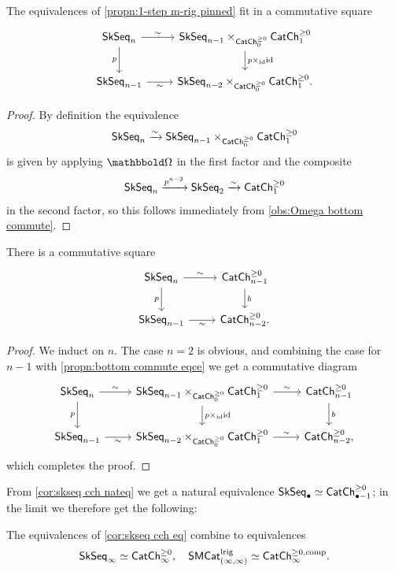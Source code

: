 \documentclass[a4paper,11pt]{article}
\begin{document}
\begin{propn}\label{propn:bottom commute eqce}
  The equivalences of \cref{propn:1-step m-rig pinned} fit in a
  commutative square
  \[
    \begin{tikzcd}
     \SkSeq_{n} \ar[r, "\sim"] \ar[d, "p"'] &
     \SkSeq_{n-1}\times_{\CChp_{0}} \CChp_{1}  \ar[d, "p \times_{\id} \id"] \\
     \SkSeq_{n-1} \ar[r, "\sim"'] & \SkSeq_{n-2} \times_{\CChp_{0}}
     \CChp_{1}.
    \end{tikzcd}
  \]
\end{propn}
\begin{proof}
  By definition the equivalence
  \[\SkSeq_{n} \isoto \SkSeq_{n-1}\times_{\CChp_{0}} \CChp_{1}\]
  is given by applying $\mOm$ in the first factor and the composite
  \[ \SkSeq_{n} \xto{p^{n-2}} \SkSeq_{2} \isoto \CChp_{1}\] in the
  second factor, so this follows immediately from \cref{obs:Omega
    bottom commute}.
\end{proof}

\begin{cor}\label{cor:skseq cch nateq}
  There is a commutative square
  \[
    \begin{tikzcd}
     \SkSeq_{n} \ar[r, "\sim"] \ar[d, "p"'] & \CChp_{n-1}  \ar[d, "b"] \\
     \SkSeq_{n-1} \ar[r, "\sim"'] & \CChp_{n-2}.
    \end{tikzcd}
  \]
\end{cor}
\begin{proof}
  We induct on $n$. The case $n = 2$ is obvious, and combining the
  case for $n-1$ with
  \cref{propn:bottom commute eqce} we get a commutative diagram
  \[
    \begin{tikzcd}
     \SkSeq_{n} \ar[r, "\sim"] \ar[d, "p"'] &
     \SkSeq_{n-1}\times_{\CChp_{0}} \CChp_{1}  \ar[d, "p \times_{\id}
     \id"] \ar[r, "\sim"] & \CChp_{n-1} \ar[d, "b"]\\
     \SkSeq_{n-1} \ar[r, "\sim"'] & \SkSeq_{n-2} \times_{\CChp_{0}}
     \CChp_{1} \ar[r, "\sim"] & \CChp_{n-2},
    \end{tikzcd}
  \]
  which completes the proof.
\end{proof}

From \cref{cor:skseq cch nateq} we get a natural equivalence
$\textup{\textsf{SkSeq}}_{\bullet} \simeq \textup{\textsf{CatCh}}^{\geq 0}_{\bullet-1}$; in the limit we therefore get the
following:
\begin{cor}\label{cor:unfolding infinite}
  The equivalences of \cref{cor:skseq cch eq} combine to equivalences
  \[ \textup{\textsf{SkSeq}}_{\infty} \simeq
    \textup{\textsf{CatCh}}^{\geq 0}_{\infty}, \quad \textup{\textsf{SMCat}}_{(\infty,\infty)}^{\text{\textup{lrig}}}
    \simeq \textup{\textsf{CatCh}}^{\geq 0,\text{\textup{comp}}}_{\infty}.\]
\end{cor}
\end{document}
